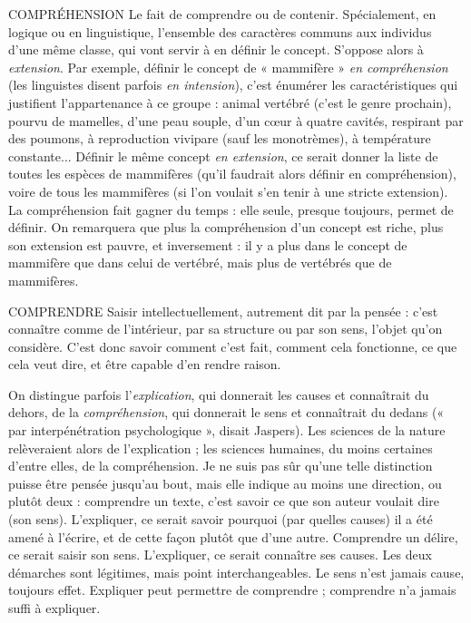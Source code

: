 COMPRÉHENSION Le fait de comprendre ou de contenir. Spécialement,
en logique ou en linguistique, l’ensemble des caractères
communs aux individus d’une même classe, qui vont servir à en définir le
concept. S’oppose alors à {\it extension}. Par exemple, définir le concept de
« mammifère » {\it en compréhension} (les linguistes disent parfois {\it en intension}), c’est
énumérer les caractéristiques qui justifient l’appartenance à ce groupe : animal
vertébré (c’est le genre prochain), pourvu de mamelles, d’une peau souple, d’un
cœur à quatre cavités, respirant par des poumons, à reproduction vivipare (sauf
les monotrèmes), à température constante... Définir le même concept {\it en extension},
ce serait donner la liste de toutes les espèces de mammifères (qu’il faudrait
alors définir en compréhension), voire de tous les mammifères (si l’on voulait
s’en tenir à une stricte extension). La compréhension fait gagner du temps : elle
seule, presque toujours, permet de définir.
On remarquera que plus la compréhension d’un concept est riche, plus son
extension est pauvre, et inversement : il y a plus dans le concept de mammifère
que dans celui de vertébré, mais plus de vertébrés que de mammifères.

COMPRENDRE Saisir intellectuellement, autrement dit par la pensée :
c’est connaître comme de l’intérieur, par sa structure ou
par son sens, l’objet qu’on considère. C’est donc savoir comment c’est fait,
comment cela fonctionne, ce que cela veut dire, et être capable d’en rendre
raison.

On distingue parfois l'{\it explication}, qui donnerait les causes et connaîtrait du
dehors, de la {\it compréhension}, qui donnerait le sens et connaîtrait du dedans
(« par interpénétration psychologique », disait Jaspers). Les sciences de la
nature relèveraient alors de l’explication ; les sciences humaines, du moins certaines
d’entre elles, de la compréhension. Je ne suis pas sûr qu’une telle distinction
puisse être pensée jusqu’au bout, mais elle indique au moins une direction,
ou plutôt deux : comprendre un texte, c’est savoir ce que son auteur voulait
dire (son sens). L’expliquer, ce serait savoir pourquoi (par quelles causes) il a été
amené à l'écrire, et de cette façon plutôt que d’une autre. Comprendre un
délire, ce serait saisir son sens. L’expliquer, ce serait connaître ses causes. Les
deux démarches sont légitimes, mais point interchangeables. Le sens n’est
jamais cause, toujours effet. Expliquer peut permettre de comprendre ; comprendre
n’a jamais suffi à expliquer.

